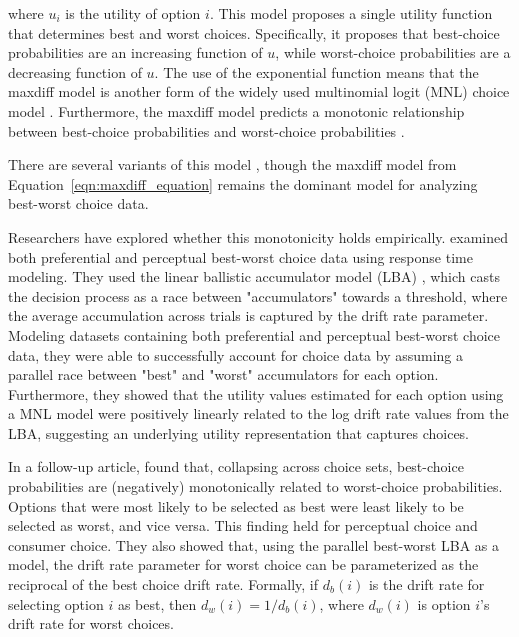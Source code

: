 where $u_{i}$ is the utility of option $i$. This model proposes a single utility function that determines best and worst choices. Specifically, it proposes that best-choice probabilities are an increasing function of $u$, while worst-choice probabilities are a decreasing function of $u$. The use of the exponential function means that the maxdiff model is another form of the widely used multinomial logit (MNL) choice model \parencite{hausman1984specification}. Furthermore, the maxdiff model predicts a monotonic relationship between best-choice probabilities and worst-choice probabilities \parencite{hawkinsBestTimesWorst2014}.

There are several variants of this model \parencite{marleyProbabilisticModelsBest2005,marleyProbabilisticModelsSetdependent2008,marleyModelsBestWorst2012,flynnBestWorstScaling2007,flynn2014best}, though the maxdiff model from Equation~\ref{eqn:maxdiff_equation} remains the dominant model for analyzing best-worst choice data.

Researchers have explored whether this monotonicity holds empirically. \textcite{hawkinsIntegratingCognitiveProcess2014a} examined both preferential and perceptual best-worst choice data using response time modeling. They used the linear ballistic accumulator model (LBA) \textcite{brownSimplestCompleteModel2008b}, which casts the decision process as a race between "accumulators" towards a threshold, where the average accumulation across trials is captured by the drift rate parameter. Modeling datasets containing both preferential and perceptual best-worst choice data, they were able to successfully account for choice data by assuming a parallel race between "best" and "worst" accumulators for each option. Furthermore, they showed that the utility values estimated for each option using a MNL model were positively linearly related to the log drift rate values from the LBA, suggesting an underlying utility representation that captures choices. 

In a follow-up article, \textcite{hawkinsBestTimesWorst2014} found that, collapsing across choice sets, best-choice probabilities are (negatively) monotonically related to worst-choice probabilities. Options that were most likely to be selected as best were least likely to be selected as worst, and vice versa. This finding held for perceptual choice and consumer choice. They also showed that, using the parallel best-worst LBA as a model, the drift rate parameter for worst choice can be parameterized as the reciprocal of the best choice drift rate. Formally, if $d_{b}(i)$ is the drift rate for selecting option $i$ as best, then $d_{w}(i)=1/d_{b}(i)$, where $d_{w}(i)$ is option $i$'s drift rate for worst choices. 

